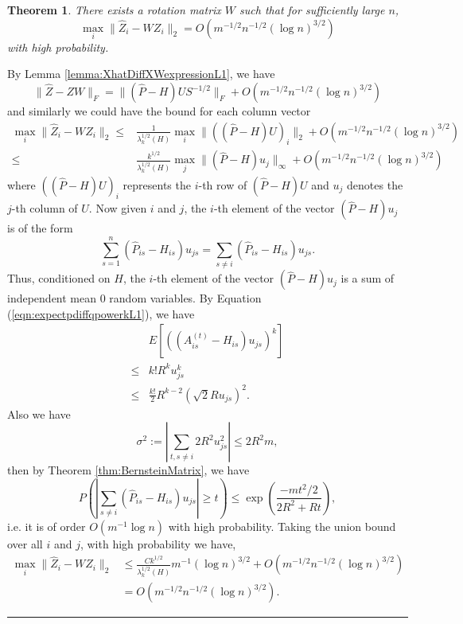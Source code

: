 \documentclass[a4paper]{article}
\newenvironment{proof}{{\bf Proof:  }}{\hfill\rule{2mm}{2mm}}
\newtheorem{theorem}[fact]{Theorem}
\begin{document}
\begin{theorem}
\label{thm:XhatDiffXWL1}
There exists a rotation matrix $W$ such that for sufficiently large $n$,
\[
	\max_i \| \hat{Z}_i - W Z_i \|_2 = O(m^{-1/2} n^{-1/2} (\log n)^{3/2})
\]
with high probability.
\end{theorem}
\begin{proof}
By Lemma \ref{lemma:XhatDiffXWexpressionL1}, we have
\[
	\|\hat{Z} - Z W\|_F = \| (\hat{P} - H) U S^{-1/2} \|_F + O(m^{-1/2} n^{-1/2} (\log n)^{3/2})
\]
and similarly we could have the bound for each column vector
\begin{align*}
	\max_i \| \hat{Z}_i - W Z_i \|_2
    \le & \frac{1}{\lambda_k^{1/2}(H)} \max_i \| ((\hat{P} - H) U)_i \|_2 + O(m^{-1/2} n^{-1/2} (\log n)^{3/2}) \\
    \le & \frac{k^{1/2}}{\lambda_k^{1/2}(H)} \max_j \| (\hat{P} - H) u_j \|_{\infty} + O(m^{-1/2} n^{-1/2} (\log n)^{3/2})
\end{align*}
where $((\hat{P} - H) U)_i$ represents the $i$-th row of $(\hat{P} - H) U$ and $u_j$ denotes the $j$-th column of $U$. Now given $i$ and $j$, the $i$-th element of the vector $(\hat{P} - H) u_j$ is of the form
\[
	\sum_{s=1}^n (\hat{P}_{is} - H_{is}) u_{js} = \sum_{s \ne i} (\hat{P}_{is} - H_{is}) u_{js}.
\]
Thus, conditioned on $H$, the $i$-th element of the vector $(\hat{P} - H) u_j$ is a sum of independent mean 0 random variables.
By Equation (\ref{eqn:expectpdiffqpowerkL1}), we have
\begin{align*}
	& E\left[\left((A^{(t)}_{is} - H_{is}) u_{js}\right)^k\right] \\ 
    \le & k! R^k u_{js}^k \\
    \le & \frac{k!}{2} R^{k-2} (\sqrt{2} R u_{js})^2.
\end{align*}
Also we have
\[
	\sigma^2 := |\sum_{t, s \ne i} 2 R^2 u_{js}^2| \le 2 R^2 m,
\]
then by Theorem \ref{thm:BernsteinMatrix}, we have
\[
	P \left( \left| \sum_{s \ne i} (\hat{P}_{is} - H_{is}) u_{js} \right| \ge t \right)
    \le \exp \left( \frac{-m t^2/2}{2 R^2 + R t} \right),
\]
i.e. it is of order $O(m^{-1} \log n)$ with high probability.
Taking the union bound over all $i$ and $j$, with high probability we have,
\begin{align*}
	\max_i \| \hat{Z}_i - W Z_i \|_2
    & \le \frac{C k^{1/2}}{\lambda_k^{1/2}(H)} m^{-1} (\log n)^{3/2} + O(m^{-1/2} n^{-1/2} (\log n)^{3/2}) \\
    & = O(m^{-1/2} n^{-1/2} (\log n)^{3/2}).
\end{align*}
\end{proof}
\end{document}
